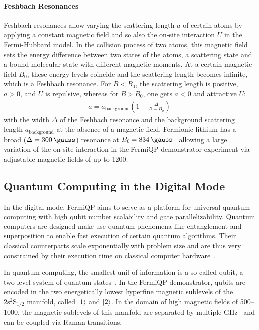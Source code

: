 \paragraph*{Feshbach Resonances} Feshbach resonances allow varying the scattering length $a$ of certain atoms by applying a constant magnetic field and so also the on-site interaction $U$ in the Fermi-Hubbard model. In the collision process of two atoms, this magnetic field sets the energy difference between two states of the atoms, a scattering state and a bound molecular state with different magnetic moments. At a certain magnetic field $B_0$, these energy levels coincide and the scattering length becomes infinite, which is a Feshbach resonance. For $B < B_0$, the scattering length is positive, $a > 0$, and $U$ is repulsive, whereas for $B > B_0$, one gets $a < 0$ and attractive $U$:
\begin{align}
    a = a_\text{background} \left(1 - \frac{\Delta}{B-B_0}\right)
\end{align}
with the width $\Delta$ of the Feshbach resonance and the background scattering length $a_\text{background}$ at the absence of a magnetic field. Fermionic lithium has a broad ($\Delta = \SI[]{300}{\gauss}$) resonance at $B_0 = \SI[]{834}{\gauss}$~\cite{chin_feshbach_2010} allowing a large variation of the on-site interaction in the FermiQP demonstrator experiment via adjustable magnetic fields of up to \SI[]{1200}{\gauss}.

\subsection*{Quantum Computing in the Digital Mode}\label{ch:digital_mode}
In the digital mode, FermiQP aims to serve as a platform for universal quantum computing with high qubit number scalability and gate parallelizability. Quantum computers are designed make use quantum phenomena like entanglement and superposition to enable fast execution of certain quantum algorithms. Their classical counterparts scale exponentially with problem size and are thus very constrained by their execution time on classical computer hardware~\cite{nielsen_quantum_2010, hidary_quantum_2021, ladd_quantum_2010, mainzer_quantencomputer_2020}.

In quantum computing, the smallest unit of information is a so-called qubit, a two-level system of quantum states~\cite{nielsen_quantum_2010, hidary_quantum_2021, ladd_quantum_2010, mainzer_quantencomputer_2020}. In the FermiQP demonstrator, qubits are encoded in the two energetically lowest hyperfine magnetic sublevels of the $2\text{s}^2\text{S}_{1/2}$ manifold, called $\Ket{1}$ and $\Ket{2}$. In the domain of high magnetic fields of \SIrange[]{500}{1000}{\gauss}, the magnetic sublevels of this manifold are separated by multiple \si[]{\giga\hertz}~\cite{gehm_properties_2003,wei_magnetic-field_2013} and can be coupled via Raman transitions.

